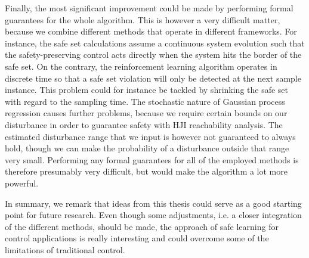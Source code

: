 \documentclass[../main.tex]{subfiles}
\begin{document}
Finally, the most significant improvement could be made by performing formal guarantees for the whole algorithm. This is however a very difficult matter, because we combine different methods that operate in different frameworks. For instance, the safe set calculations assume a continuous system evolution such that the safety-preserving control acts directly when the system hits the border of the safe set. On the contrary, the reinforcement learning algorithm operates in discrete time so that a safe set violation will only be detected at the next sample instance. This problem could for instance be tackled by shrinking the safe set with regard to the sampling time. The stochastic nature of Gaussian process regression causes further problems, because we require certain bounds on our disturbance in order to guarantee safety with HJI reachability analysis. The estimated disturbance range that we input is however not guaranteed to always hold, though we can make the probability of a disturbance outside that range very small. Performing any formal guarantees for all of the employed methods is therefore presumably very difficult, but would make the algorithm a lot more powerful. \par


In summary, we remark that ideas from this thesis could serve as a good starting point for future research. Even though some adjustments, i.e. a closer integration of the different methods, should be made, the approach of safe learning for control applications is really interesting and could overcome some of the limitations of traditional control.
\end{document}

